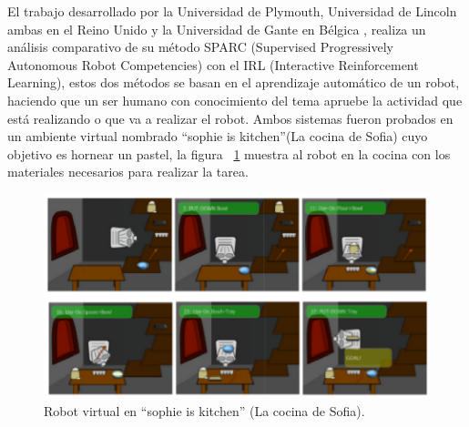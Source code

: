 El trabajo desarrollado por la Universidad de Plymouth, Universidad de
 Lincoln ambas en el Reino Unido y la Universidad de Gante en B\'elgica
 \cite{Senft2016}, realiza un an\'alisis comparativo de su m\'etodo SPARC (Supervised
 Progressively Autonomous Robot Competencies) con el IRL (Interactive
 Reinforcement Learning), estos dos m\'etodos se basan en el aprendizaje 
 autom\'atico de un robot, haciendo que un ser humano con conocimiento del tema
 apruebe la actividad que est\'a realizando o que va a realizar el robot.
 Ambos sistemas fueron probados en un ambiente virtual nombrado ``sophie is
 kitchen''(La cocina de Sofia) cuyo objetivo es hornear un pastel, 
 la figura ~\ref{fig:sparcrob} muestra al robot en la cocina con los materiales
 necesarios para realizar la tarea. 
 
\begin{figure}[h]
\centering
\includegraphics[width=0.8\columnwidth]{chap2/Imagenes/Sparc.eps}
\caption{Robot virtual en ``sophie is kitchen'' (La cocina de Sofia).}
\label{fig:sparcrob}
\end{figure}